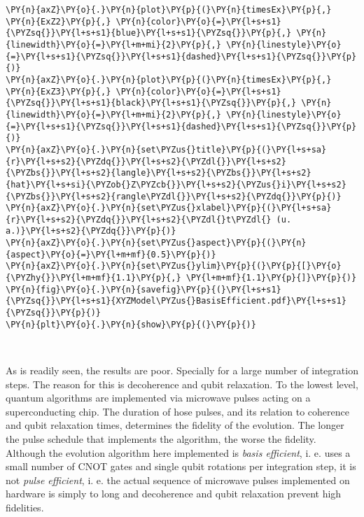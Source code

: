 \begin{tcolorbox}[breakable, size=fbox, boxrule=1pt, pad at break*=1mm,colback=cellbackground, colframe=cellborder]
\begin{Verbatim}[commandchars=\\\{\}]
\PY{n}{axZ}\PY{o}{.}\PY{n}{plot}\PY{p}{(}\PY{n}{timesEx}\PY{p}{,} \PY{n}{ExZ2}\PY{p}{,} \PY{n}{color}\PY{o}{=}\PY{l+s+s1}{\PYZsq{}}\PY{l+s+s1}{blue}\PY{l+s+s1}{\PYZsq{}}\PY{p}{,} \PY{n}{linewidth}\PY{o}{=}\PY{l+m+mi}{2}\PY{p}{,} \PY{n}{linestyle}\PY{o}{=}\PY{l+s+s1}{\PYZsq{}}\PY{l+s+s1}{dashed}\PY{l+s+s1}{\PYZsq{}}\PY{p}{)}
\PY{n}{axZ}\PY{o}{.}\PY{n}{plot}\PY{p}{(}\PY{n}{timesEx}\PY{p}{,} \PY{n}{ExZ3}\PY{p}{,} \PY{n}{color}\PY{o}{=}\PY{l+s+s1}{\PYZsq{}}\PY{l+s+s1}{black}\PY{l+s+s1}{\PYZsq{}}\PY{p}{,} \PY{n}{linewidth}\PY{o}{=}\PY{l+m+mi}{2}\PY{p}{,} \PY{n}{linestyle}\PY{o}{=}\PY{l+s+s1}{\PYZsq{}}\PY{l+s+s1}{dashed}\PY{l+s+s1}{\PYZsq{}}\PY{p}{)}
\PY{n}{axZ}\PY{o}{.}\PY{n}{set\PYZus{}title}\PY{p}{(}\PY{l+s+sa}{r}\PY{l+s+s2}{\PYZdq{}}\PY{l+s+s2}{\PYZdl{}}\PY{l+s+s2}{\PYZbs{}}\PY{l+s+s2}{langle}\PY{l+s+s2}{\PYZbs{}}\PY{l+s+s2}{hat}\PY{l+s+si}{\PYZob{}Z\PYZcb{}}\PY{l+s+s2}{\PYZus{}i}\PY{l+s+s2}{\PYZbs{}}\PY{l+s+s2}{rangle\PYZdl{}}\PY{l+s+s2}{\PYZdq{}}\PY{p}{)}
\PY{n}{axZ}\PY{o}{.}\PY{n}{set\PYZus{}xlabel}\PY{p}{(}\PY{l+s+sa}{r}\PY{l+s+s2}{\PYZdq{}}\PY{l+s+s2}{\PYZdl{}t\PYZdl{} (u. a.)}\PY{l+s+s2}{\PYZdq{}}\PY{p}{)}
\PY{n}{axZ}\PY{o}{.}\PY{n}{set\PYZus{}aspect}\PY{p}{(}\PY{n}{aspect}\PY{o}{=}\PY{l+m+mf}{0.5}\PY{p}{)}
\PY{n}{axZ}\PY{o}{.}\PY{n}{set\PYZus{}ylim}\PY{p}{(}\PY{p}{[}\PY{o}{\PYZhy{}}\PY{l+m+mf}{1.1}\PY{p}{,} \PY{l+m+mf}{1.1}\PY{p}{]}\PY{p}{)}
\PY{n}{fig}\PY{o}{.}\PY{n}{savefig}\PY{p}{(}\PY{l+s+s1}{\PYZsq{}}\PY{l+s+s1}{XYZModel\PYZus{}BasisEfficient.pdf}\PY{l+s+s1}{\PYZsq{}}\PY{p}{)}
\PY{n}{plt}\PY{o}{.}\PY{n}{show}\PY{p}{(}\PY{p}{)}
\end{Verbatim}
\end{tcolorbox}

    \begin{center}
    \end{center}
    { \hspace*{\fill} \\}
    
    As is readily seen, the results are poor. Specially for a large number
of integration steps. The reason for this is decoherence and qubit
relaxation. To the lowest level, quantum algorithms are implemented via
microwave pulses acting on a superconducting chip. The duration of hose
pulses, and its relation to coherence and qubit relaxation times,
determines the fidelity of the evolution. The longer the pulse schedule
that implements the algorithm, the worse the fidelity. Although the
evolution algorithm here implemented is \emph{basis efficient}, i. e.
uses a small number of CNOT gates and single qubit rotations per
integration step, it is not \emph{pulse efficient}, i. e. the actual
sequence of microwave pulses implemented on hardware is simply to long
and decoherence and qubit relaxation prevent high fidelities.


